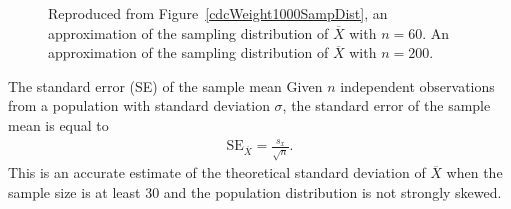 \begin{figure}[h]
	\centering
	\caption{ Reproduced from Figure~\ref{cdcWeight1000SampDist}, an approximation of the sampling distribution of $\overline{X}$ with $n = 60$.  An approximation of the sampling distribution of $\overline{X}$ with $n = 200$.}
	\label{cdcSamplingVariabilityComparison}
\end{figure}


\begin{onebox}{The standard error (SE) of the sample mean}
Given $n$ independent observations from a population with standard deviation $\sigma$, the standard error of the sample mean is equal to
\begin{align}
\text{SE}_{\overline{X}} = \frac{s_x}{\sqrt{n}}.
\label{seOfXBar}
\end{align}
This is an accurate estimate of the theoretical standard deviation of $\overline{X}$ when the sample size is at least 30 and the population distribution is not strongly skewed.
\end{onebox}

